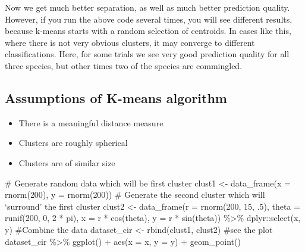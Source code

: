 \documentclass[
  letterpaper,
  DIV=11,
  numbers=noendperiod]{scrreprt}
\newenvironment{Shaded}{\begin{snugshade}}{\end{snugshade}}
\newcommand{\AttributeTok}[1]{\textcolor[rgb]{0.40,0.45,0.13}{#1}}
\newcommand{\CommentTok}[1]{\textcolor[rgb]{0.37,0.37,0.37}{#1}}
\newcommand{\DecValTok}[1]{\textcolor[rgb]{0.68,0.00,0.00}{#1}}
\newcommand{\FunctionTok}[1]{\textcolor[rgb]{0.28,0.35,0.67}{#1}}
\newcommand{\NormalTok}[1]{\textcolor[rgb]{0.00,0.23,0.31}{#1}}
\newcommand{\OtherTok}[1]{\textcolor[rgb]{0.00,0.23,0.31}{#1}}
\newcommand{\SpecialCharTok}[1]{\textcolor[rgb]{0.37,0.37,0.37}{#1}}
\providecommand{\tightlist}{%
  \setlength{\itemsep}{0pt}\setlength{\parskip}{0pt}}\usepackage{longtable,booktabs,array}
\begin{document}
Now we get much better separation, as well as much better prediction
quality. However, if you run the above code several times, you will see
different results, because k-means starts with a random selection of
centroids. In cases like this, where there is not very obvious clusters,
it may converge to different classifications. Here, for some trials we
see very good prediction quality for all three species, but other times
two of the species are commingled.

\hypertarget{assumptions-of-k-means-algorithm}{%
\subsection{Assumptions of K-means
algorithm}\label{assumptions-of-k-means-algorithm}}

\begin{itemize}
\tightlist
\item
  There is a meaningful distance measure
\item
  Clusters are roughly spherical
\item
  Clusters are of similar size
\end{itemize}

\begin{Shaded}
\begin{Highlighting}[]
\CommentTok{\# Generate random data which will be first cluster}
\NormalTok{clust1 }\OtherTok{\textless{}{-}} \FunctionTok{data\_frame}\NormalTok{(}\AttributeTok{x =} \FunctionTok{rnorm}\NormalTok{(}\DecValTok{200}\NormalTok{), }\AttributeTok{y =} \FunctionTok{rnorm}\NormalTok{(}\DecValTok{200}\NormalTok{))}
\CommentTok{\# Generate the second cluster which will ‘surround’ the first cluster}
\NormalTok{clust2 }\OtherTok{\textless{}{-}} \FunctionTok{data\_frame}\NormalTok{(}\AttributeTok{r =} \FunctionTok{rnorm}\NormalTok{(}\DecValTok{200}\NormalTok{, }\DecValTok{15}\NormalTok{, .}\DecValTok{5}\NormalTok{), }
                     \AttributeTok{theta =} \FunctionTok{runif}\NormalTok{(}\DecValTok{200}\NormalTok{, }\DecValTok{0}\NormalTok{, }\DecValTok{2} \SpecialCharTok{*}\NormalTok{ pi),}
                 \AttributeTok{x =}\NormalTok{ r }\SpecialCharTok{*} \FunctionTok{cos}\NormalTok{(theta), }\AttributeTok{y =}\NormalTok{ r }\SpecialCharTok{*} \FunctionTok{sin}\NormalTok{(theta)) }\SpecialCharTok{\%\textgreater{}\%}
\NormalTok{  dplyr}\SpecialCharTok{::}\FunctionTok{select}\NormalTok{(x, y)}
\CommentTok{\#Combine the data}
\NormalTok{dataset\_cir }\OtherTok{\textless{}{-}} \FunctionTok{rbind}\NormalTok{(clust1, clust2)}
\CommentTok{\#see the plot}
\NormalTok{dataset\_cir }\SpecialCharTok{\%\textgreater{}\%} \FunctionTok{ggplot}\NormalTok{() }\SpecialCharTok{+} \FunctionTok{aes}\NormalTok{(}\AttributeTok{x =}\NormalTok{ x, }\AttributeTok{y =}\NormalTok{ y) }\SpecialCharTok{+} \FunctionTok{geom\_point}\NormalTok{()}
\end{Highlighting}
\end{Shaded}
\end{document}
